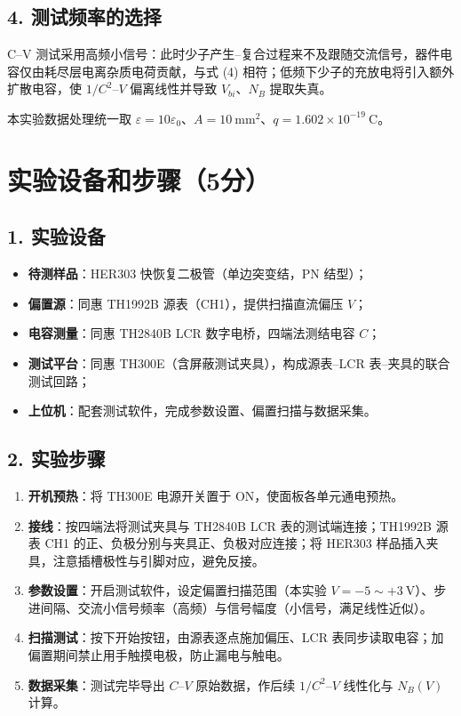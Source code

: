 \documentclass[12pt,a4paper]{ctexart}
\begin{document}
\subsection*{4. 测试频率的选择}
C--V 测试采用高频小信号：此时少子产生--复合过程来不及跟随交流信号，器件电容仅由耗尽层电离杂质电荷贡献，与式 (4) 相符；低频下少子的充放电将引入额外扩散电容，使 $1/C^{2}$--$V$ 偏离线性并导致 $V_{bi}$、$N_B$ 提取失真。

本实验数据处理统一取 $\varepsilon=10\varepsilon_0$、$A=10\ \mathrm{mm^{2}}$、$q=1.602\times10^{-19}\ \mathrm{C}$。


\section*{实验设备和步骤（5分）}

\subsection*{1. 实验设备}
\begin{itemize}
    \item \textbf{待测样品}：HER303 快恢复二极管（单边突变结，PN 结型）；
    \item \textbf{偏置源}：同惠 TH1992B 源表（CH1），提供扫描直流偏压 $V$；
    \item \textbf{电容测量}：同惠 TH2840B LCR 数字电桥，四端法测结电容 $C$；
    \item \textbf{测试平台}：同惠 TH300E（含屏蔽测试夹具），构成源表--LCR 表--夹具的联合测试回路；
    \item \textbf{上位机}：配套测试软件，完成参数设置、偏置扫描与数据采集。
\end{itemize}

\subsection*{2. 实验步骤}
\begin{enumerate}
    \item \textbf{开机预热}：将 TH300E 电源开关置于 ON，使面板各单元通电预热。
    \item \textbf{接线}：按四端法将测试夹具与 TH2840B LCR 表的测试端连接；TH1992B 源表 CH1 的正、负极分别与夹具正、负极对应连接；将 HER303 样品插入夹具，注意插槽极性与引脚对应，避免反接。
    \item \textbf{参数设置}：开启测试软件，设定偏置扫描范围（本实验 $V=-5\sim+3\ \mathrm{V}$）、步进间隔、交流小信号频率（高频）与信号幅度（小信号，满足线性近似）。
    \item \textbf{扫描测试}：按下开始按钮，由源表逐点施加偏压、LCR 表同步读取电容；加偏置期间禁止用手触摸电极，防止漏电与触电。
    \item \textbf{数据采集}：测试完毕导出 $C$--$V$ 原始数据，作后续 $1/C^{2}$--$V$ 线性化与 $N_B(V)$ 计算。
\end{enumerate}
\end{document}
